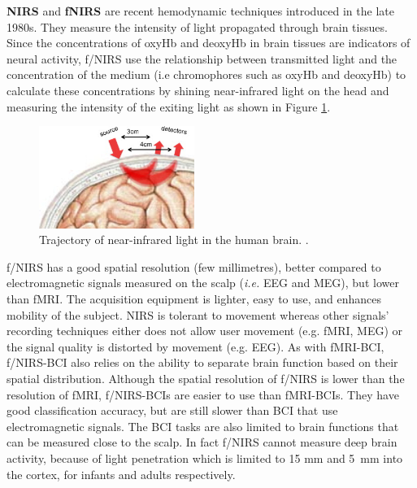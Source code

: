 \textbf{NIRS} and \textbf{fNIRS} are recent hemodynamic techniques introduced in the late 1980s. 
They measure the intensity of light propagated through brain tissues. Since the concentrations of oxyHb and deoxyHb in brain tissues are indicators of neural activity, f/NIRS use the relationship between transmitted light and the concentration of the medium (i.e chromophores such as oxyHb and deoxyHb) to calculate these concentrations by shining near-infrared light on the head and measuring the intensity of the exiting light as shown in Figure \ref{fig:nirs}.

\begin{figure}[h!]
\centering
\includegraphics[width=0.45\textwidth]{Figures/nirs}
\caption{Trajectory of near-infrared light in the human brain. \citep[Reproduced from][]{gervain_near-infrared_2011}.}
\label{fig:nirs}
\end{figure} 

f/NIRS has a good spatial resolution (few millimetres), better compared to electromagnetic signals measured on the scalp (\textit{i.e.} EEG and MEG), but lower than fMRI.
The acquisition equipment is lighter, easy to use, and enhances mobility of the subject. 
NIRS is tolerant to movement whereas other signals' recording techniques either does not allow user movement (e.g. fMRI, MEG) or the signal quality is distorted by movement (e.g. EEG).
As with fMRI-BCI, f/NIRS-BCI also relies on the ability to separate brain function based on their spatial distribution. 
Although the spatial resolution of f/NIRS is lower than the resolution of fMRI, f/NIRS-BCIs are easier to use than fMRI-BCIs.
They have good classification accuracy, but are still slower than BCI that use electromagnetic signals. 
The BCI tasks are also limited to brain functions that can be measured close to the scalp. 
In fact f/NIRS cannot measure deep brain activity, because of light penetration which is limited to 15 mm and 5~mm into the cortex, for infants and adults respectively. 


